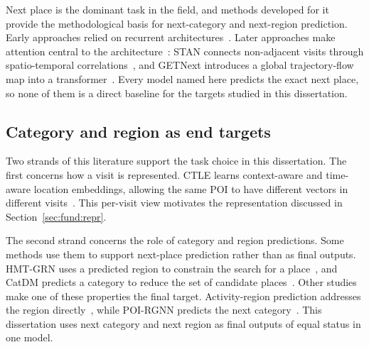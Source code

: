 Next place is the dominant task in the field, and methods developed for it provide the
methodological basis for next-category and next-region prediction.
Early approaches relied on recurrent
architectures~\cite{liu2016strnn,feng2018deepmove,kong2018hstlstm,yang2020flashback}.
Later approaches make attention central to the architecture~\cite{lian2020geosan}: STAN
connects non-adjacent visits through spatio-temporal correlations~\cite{luo2021stan},
and GETNext introduces a global trajectory-flow map into a
transformer~\cite{yang2022getnext}. Every model named here predicts the exact next
place, so none of them is a direct baseline for the targets studied in this dissertation.

\subsection{Category and region as end targets}

Two strands of this literature support the task choice in this dissertation. The first
concerns how a visit is represented. CTLE learns context-aware and time-aware location
embeddings, allowing the same POI to have different vectors in different
visits~\cite{lin2021ctle}. This per-visit view motivates the representation discussed in
Section~\ref{sec:fund:repr}.

The second strand concerns the role of category and region predictions. Some methods
use them to support next-place prediction rather than as final outputs. HMT-GRN uses a
predicted region to constrain the search for a place~\cite{Lim2022}, and CatDM predicts
a category to reduce the set of candidate places~\cite{yu2020catdm}. Other studies make
one of these properties the final target. Activity-region prediction addresses the
region directly~\cite{zhu2022drrgnn}, while POI-RGNN predicts the next
category~\cite{capanema2023poirgnn}. This dissertation uses next category and next
region as final outputs of equal status in one model.


